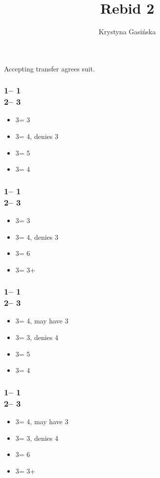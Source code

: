 \documentclass[12pt, a4paper]{article}
\title{Rebid 2\nt}
\author{Krystyna Gasińska}
\begin{document}
\maketitle


Accepting transfer agrees suit.

\subsubsection*{1\clubs -- 1\hearts \\ 2\nt -- 3\clubs}
\begin{itemize}
    \item 3\diams = 3\hearts
    \item 3\hearts = 4\spades, denies 3\hearts
    \item 3\spades = 5\clubs
    \item 3\nt = 4\diams
\end{itemize}

\subsubsection*{1\diams -- 1\hearts \\ 2\nt -- 3\clubs}
\begin{itemize}
    \item 3\diams = 3\hearts
    \item 3\hearts = 4\spades, denies 3\hearts
    \item 3\spades = 6\diams
    \item 3\nt = 3+\clubs
\end{itemize}

\subsubsection*{1\clubs -- 1\spades \\ 2\nt -- 3\clubs}
\begin{itemize}
    \item 3\diams = 4\hearts, may have 3\spades
    \item 3\hearts = 3\spades, denies 4\hearts
    \item 3\spades = 5\clubs
    \item 3\nt = 4\diams
\end{itemize}

\subsubsection*{1\diams -- 1\spades \\ 2\nt -- 3\clubs}
\begin{itemize}
    \item 3\diams = 4\hearts, may have 3\spades
    \item 3\hearts = 3\spades, denies 4\hearts
    \item 3\spades = 6\diams
    \item 3\nt = 3+\clubs
\end{itemize}

\end{document}

